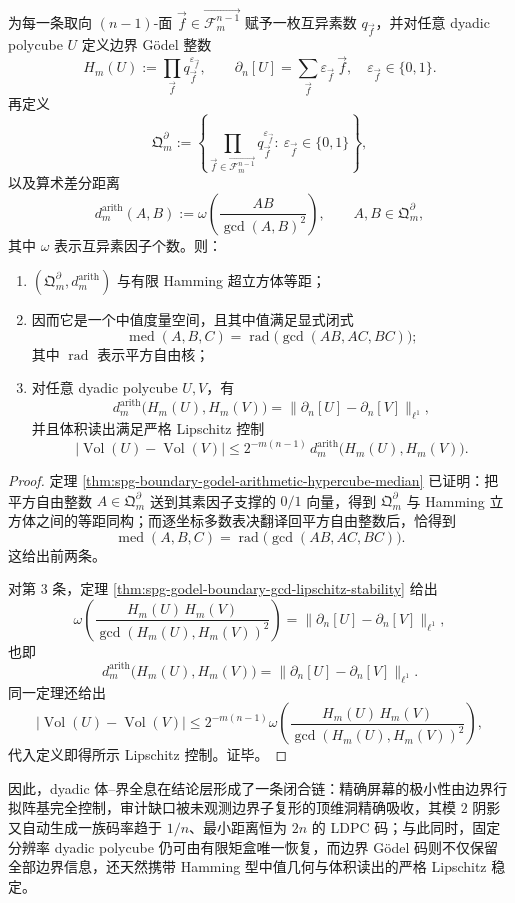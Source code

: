 \begin{theorem}\label{thm:xi-time-part9fa-boundary-godel-median-lipschitz}
为每一条取向 \((n-1)\)-面 \(\vec f\in\overrightarrow{\mathcal F_m^{n-1}}\) 赋予一枚互异素数 \(q_{\vec f}\)，并对任意 dyadic polycube \(U\) 定义边界 Gödel 整数
\[
H_m(U):=
\prod_{\vec f}q_{\vec f}^{\varepsilon_{\vec f}},
\qquad
\partial_n[U]=\sum_{\vec f}\varepsilon_{\vec f}\,\vec f,
\quad
\varepsilon_{\vec f}\in\{0,1\}.
\]
再定义
\[
\mathfrak Q_m^{\partial}
:=
\left\{
\prod_{\vec f\in\overrightarrow{\mathcal F_m^{n-1}}}
q_{\vec f}^{\varepsilon_{\vec f}}
:\ \varepsilon_{\vec f}\in\{0,1\}
\right\},
\]
以及算术差分距离
\[
d_m^{\mathrm{arith}}(A,B):=
\omega\!\left(\frac{AB}{\gcd(A,B)^2}\right),
\qquad
A,B\in\mathfrak Q_m^{\partial},
\]
其中 \(\omega\) 表示互异素因子个数。则：
\begin{enumerate}
  \item \((\mathfrak Q_m^{\partial},d_m^{\mathrm{arith}})\) 与有限 Hamming 超立方体等距；
  \item 因而它是一个中值度量空间，且其中值满足显式闭式
        \[
        \operatorname{med}(A,B,C)=\operatorname{rad}\!\bigl(\gcd(AB,AC,BC)\bigr);
        \]
        其中 \(\operatorname{rad}\) 表示平方自由核；
  \item 对任意 dyadic polycube \(U,V\)，有
        \[
        d_m^{\mathrm{arith}}\bigl(H_m(U),H_m(V)\bigr)
        =
        \bigl\|\partial_n[U]-\partial_n[V]\bigr\|_{\ell^1},
        \]
        并且体积读出满足严格 Lipschitz 控制
        \[
        \bigl|\operatorname{Vol}(U)-\operatorname{Vol}(V)\bigr|
        \le
        2^{-m(n-1)}\,
        d_m^{\mathrm{arith}}\bigl(H_m(U),H_m(V)\bigr).
        \]
\end{enumerate}
\end{theorem}
\begin{proof}
定理 \ref{thm:spg-boundary-godel-arithmetic-hypercube-median} 已证明：把平方自由整数 \(A\in\mathfrak Q_m^{\partial}\) 送到其素因子支撑的 \(0/1\) 向量，得到 \(\mathfrak Q_m^{\partial}\) 与 Hamming 立方体之间的等距同构；而逐坐标多数表决翻译回平方自由整数后，恰得到
\[
\operatorname{med}(A,B,C)=\operatorname{rad}\!\bigl(\gcd(AB,AC,BC)\bigr).
\]
这给出前两条。

对第 \(3\) 条，定理 \ref{thm:spg-godel-boundary-gcd-lipschitz-stability} 给出
\[
\omega\!\left(\frac{H_m(U)\,H_m(V)}{\gcd(H_m(U),H_m(V))^2}\right)
=
\bigl\|\partial_n[U]-\partial_n[V]\bigr\|_{\ell^1},
\]
也即
\[
d_m^{\mathrm{arith}}\bigl(H_m(U),H_m(V)\bigr)
=
\bigl\|\partial_n[U]-\partial_n[V]\bigr\|_{\ell^1}.
\]
同一定理还给出
\[
\bigl|\operatorname{Vol}(U)-\operatorname{Vol}(V)\bigr|
\le
2^{-m(n-1)}
\omega\!\left(\frac{H_m(U)\,H_m(V)}{\gcd(H_m(U),H_m(V))^2}\right),
\]
代入定义即得所示 Lipschitz 控制。证毕。
\end{proof}

\noindent
因此，dyadic 体--界全息在结论层形成了一条闭合链：精确屏幕的极小性由边界行拟阵基完全控制，审计缺口被未观测边界子复形的顶维洞精确吸收，其模 \(2\) 阴影又自动生成一族码率趋于 \(1/n\)、最小距离恒为 \(2n\) 的 LDPC 码；与此同时，固定分辨率 dyadic polycube 仍可由有限矩盒唯一恢复，而边界 Gödel 码则不仅保留全部边界信息，还天然携带 Hamming 型中值几何与体积读出的严格 Lipschitz 稳定。

\endinput
